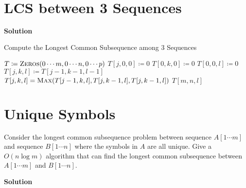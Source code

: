 \documentclass{../../cls/sig-alternate-05-2015}
\begin{document}
\section{LCS between 3 Sequences}
\textbf{Solution}\begin{algorithm}[H]
	\caption{Compute the Longest Common Subsequence among
		3 Sequences}
	\label{a-5}
	\begin{algorithmic}
		\State $T \coloneqq \Call{Zeros}{0 \cdots m, 0 \cdots n, 0 \cdots p}$
		\State $T[j, 0, 0] \coloneqq 0$
		\EndFor
		\State $T[0, k, 0] \coloneqq 0$
		\EndFor
		\State $T[0, 0, l] \coloneqq 0$
		\EndFor
		\State $T[j, k, l] \coloneqq T[j - 1, k - 1, l - 1]$
		\Else
		\State $T[j, k, l] = \Call{Max}{T[j - 1, k, l], T[j, k - 1, l], T[j, k - 1, l]}$
		\EndIf
		\EndFor
		\EndFor
		\EndFor
		\State \Return $T[m, n, l]$
		\EndProcedure
	\end{algorithmic}
\end{algorithm}

\section{Unique Symbols}
Consider the longest common subsequence problem between sequence $A[1\cdots m]$ and sequence $B[1\cdots n]$ where
the symbols in $A$ are all unique. Give a $O(n \log m)$ algorithm that can find the longest common subsequence
between $A[1\cdots m]$ and $B[1\cdots n]$. 

\textbf{Solution}
\end{document}
